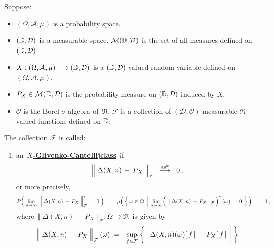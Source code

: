 \begin{definition}
\mbox{}\vskip 0.1cm
\noindent
Suppose:
\begin{itemize}
\item
	$(\Omega,\mathcal{A},\mu)$ is a probability space.
\item
	$(\mathbb{D},\mathcal{D})$\, is a measurable space.
	$\mathcal{M}(\mathbb{D},\mathcal{D})$ is the set of all measures defined on $(\mathbb{D},\mathcal{D})$.
\item
	$X : (\Omega,\mathcal{A},\mu) \longrightarrow (\mathbb{D},\mathcal{D})$
	is a $(\mathbb{D},\mathcal{D})$-valued random variable defined on
	$(\Omega,\mathcal{A},\mu)$.
\item
	$P_{X} \in \mathcal{M}(\mathbb{D},\mathcal{D})$ is the probability measure
	on $(\mathbb{D},\mathcal{D})$ induced by $X$.
\item
	$\mathcal{O}$ is the Borel $\sigma$-algebra of \,$\Re$.
	$\mathcal{F}$ is a collection of $(\mathcal{D},\mathcal{O})$-measurable $\Re$-valued functions
	defined on $\mathbb{D}$.
\end{itemize}
The collection $\mathcal{F}$ is called:
\begin{enumerate}
\item
	an \,\underline{\textbf{$X$-Glivenko-Cantelli{\color{white}j}class}}\, if
	\begin{equation*}
	\left\Vert\;\Delta(X,n) \,\overset{{\color{white}.}}{-}\, P_{X}\;\right\Vert_{\mathcal{F}}
	\;\;\overset{\textnormal{as*}}{\longrightarrow}\;\;0\,,
	\end{equation*}
	or more precisely,
	\begin{equation*}
	P\!\left(\;
		\underset{n\rightarrow\infty}{\lim}
		\;\left\Vert\;\Delta(X,n) \,\overset{{\color{white}.}}{-}\, P_{X}\;\right\Vert_{\mathcal{F}}^{*}
		\,=\, 0
	\;\right)
	\;\; = \;\;
	\mu\!\left(\,\left\{\;
		\omega\in\Omega
	\;\left\vert\;\,
		\underset{n\rightarrow\infty}{\lim}
		\left(\;\Vert\;\Delta(X,n) \,\overset{{\color{white}.}}{-}\, P_{X}\;\Vert_{\mathcal{F}}\,\right)^{*}(\omega)
		\,=\, 0
		\right.
	\;\right\}\,\right)
	\;\; = \;\; 1\,,
	\end{equation*}
	where \,$\Vert\;\Delta(X,n) \,-\, P_{X}\;\Vert_{\mathcal{F}} : \Omega \longrightarrow \Re$\,
	is given by
	\begin{eqnarray*}
	\left\Vert\;\Delta(X,n) \,\overset{{\color{white}.}}{-}\, P_{X}\;\right\Vert_{\mathcal{F}}(\omega)
	& := &
		\underset{f\in\mathcal{F}}{\sup}\left\{\,
			\left\vert\; \Delta(X,n)(\omega)[\,f\,]\,\overset{{\color{white}+}}{-}\,P_{X}[\,f\,] \;\right\vert
		\;\right\}

\end{eqnarray*}
\end{enumerate}
\end{definition}
